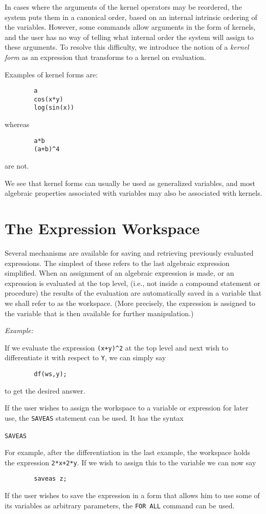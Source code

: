 In cases where the arguments of the kernel operators may be reordered, the
system puts them in a canonical order, based on an internal intrinsic
ordering of the variables. However, some commands allow arguments in the
form of kernels, and the user has no way of telling what internal order the
system will assign to these arguments. To resolve this difficulty, we
introduce the notion of a \emph{kernel form} as an
expression that transforms to a kernel on evaluation.

Examples of kernel forms are:
\begin{verbatim}
        a
        cos(x*y)
        log(sin(x))
\end{verbatim}
whereas
\begin{verbatim}
        a*b
        (a+b)^4
\end{verbatim}
are not.

We see that kernel forms can usually be used as generalized variables, and
most algebraic properties associated with variables may also be associated
with kernels.

\section{The Expression Workspace}\label{Workspace}

Several mechanisms are available for saving and retrieving previously
evaluated expressions.  The simplest of these refers to the last algebraic
expression simplified.  When an assignment of an algebraic expression is
made, or an expression is evaluated at the top level, (i.e., not inside a
compound statement or procedure) the results of the evaluation are
automatically saved in a variable  that we shall refer to as the
workspace. (More precisely, the expression is assigned to the variable
 that is then available for further manipulation.)

\textit{Example:}

If we evaluate the expression \texttt{(x+y)\textasciicircum2} at the top
level and next
wish to differentiate it with respect to \texttt{Y}, we can simply say
\begin{verbatim}
        df(ws,y);
\end{verbatim}
to get the desired answer.

\hypertarget{command:SAVEAS}{}
If the user wishes to assign the workspace to a variable or expression for
later use, the \texttt{SAVEAS}
 statement can be used.  It
has the syntax
\begin{syntax}
  \texttt{SAVEAS}\ 
\end{syntax}
For example, after the differentiation in the last example, the workspace
holds the expression \texttt{2*x+2*y}.  If we wish to assign this to the
variable  we can now say
\begin{verbatim}
        saveas z;
\end{verbatim}
If the user wishes to save the expression in a form that allows him to use
some of its variables as arbitrary parameters, the \texttt{FOR ALL}
command can be used.

